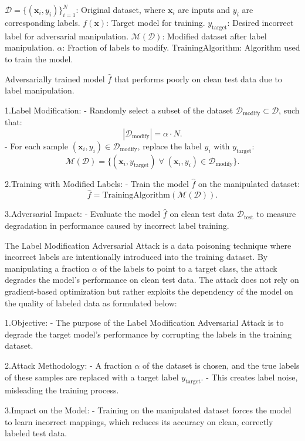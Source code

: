 $\mathcal{D} = \{(\mathbf{x}_i, y_i)\}_{i=1}^N$: Original dataset, where $\mathbf{x}_i$ are inputs and $y_i$ are corresponding labels.
$f(\mathbf{x})$: Target model for training.
$y_{\text{target}}$: Desired incorrect label for adversarial manipulation.
$\mathcal{M}(\mathcal{D})$: Modified dataset after label manipulation.
$\alpha$: Fraction of labels to modify.
$\text{TrainingAlgorithm}$: Algorithm used to train the model.

Adversarially trained model $\hat{f}$ that performs poorly on clean test data due to label manipulation.

1.Label Modification:
   - Randomly select a subset of the dataset $\mathcal{D}_{\text{modify}} \subset \mathcal{D}$, such that:
     \[
     |\mathcal{D}_{\text{modify}}| = \alpha \cdot N.
     \]
   - For each sample $(\mathbf{x}_i, y_i) \in \mathcal{D}_{\text{modify}}$, replace the label $y_i$ with $y_{\text{target}}$:
     \[
     \mathcal{M}(\mathcal{D}) = \{(\mathbf{x}_i, y_{\text{target}}) \; \forall \; (\mathbf{x}_i, y_i) \in \mathcal{D}_{\text{modify}}\}.
     \]

2.Training with Modified Labels:
   - Train the model $\hat{f}$ on the manipulated dataset:
     \[
     \hat{f} = \text{TrainingAlgorithm}(\mathcal{M}(\mathcal{D})).
     \]

3.Adversarial Impact:
   - Evaluate the model $\hat{f}$ on clean test data $\mathcal{D}_{\text{test}}$ to measure degradation in performance caused by incorrect label training.

The Label Modification Adversarial Attack is a data poisoning technique where incorrect labels are intentionally introduced into the training dataset. By manipulating a fraction $\alpha$ of the labels to point to a target class, the attack degrades the model's performance on clean test data. The attack does not rely on gradient-based optimization but rather exploits the dependency of the model on the quality of labeled data as formulated below:

1.Objective:
   - The purpose of the Label Modification Adversarial Attack is to degrade the target model's performance by corrupting the labels in the training dataset.

2.Attack Methodology:
   - A fraction $\alpha$ of the dataset is chosen, and the true labels of these samples are replaced with a target label $y_{\text{target}}$.
   - This creates label noise, misleading the training process.

3.Impact on the Model:
   - Training on the manipulated dataset forces the model to learn incorrect mappings, which reduces its accuracy on clean, correctly labeled test data.

